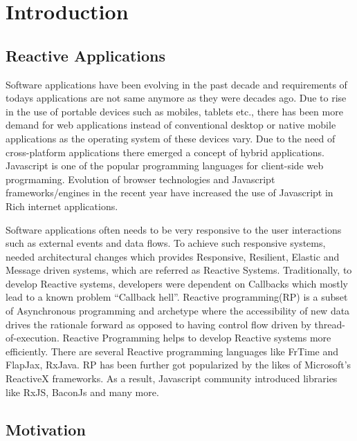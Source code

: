 \chapter{Introduction} \label{chap:Introduction}

\section{Reactive Applications}
Software applications have been evolving in the past decade and requirements of today\textquotesingle s applications are not same anymore as they were decades ago\cite{reactiveManifesto}. 
Due to rise in the use of portable devices such as mobiles, tablets etc., there has been more demand for web applications instead of conventional desktop or native mobile applications as the operating system of these devices vary\cite{7818919}. 
Due to the need of cross-platform applications there emerged a concept of hybrid applications. Javascript is one of the popular programming languages for client-side web progrmaming. Evolution of browser technologies and Javascript frameworks/engines in the recent year have increased the use of Javascript in Rich internet applications\cite{6068340}\cite{Sen:2013:JSR:2491411.2491447}. 

Software applications often needs to be very responsive to the user interactions such as external events and data flows. 
To achieve such responsive systems, needed architectural changes which provides Responsive, Resilient, Elastic and Message driven systems, which are referred as Reactive Systems\cite{reactiveManifesto}. Traditionally, to develop Reactive systems, developers were dependent on Callbacks which mostly lead to a known problem ``Callback hell''. 
Reactive programming(RP) is a subset of Asynchronous programming and archetype where the accessibility of new data drives the rationale forward as opposed to having control flow driven by thread-of-execution. 
Reactive Programming helps to develop Reactive systems more efficiently. 
There are several Reactive programming languages like FrTime\cite{Cooper2006} and FlapJax\cite{Meyerovich:2009:FPL:1639949.1640091}, RxJava\cite{rxJava}. RP has been further got popularized by the likes of Microsoft's ReactiveX frameworks\cite{reactiveX}.  As a result, Javascript community introduced libraries like RxJS\cite{rxjs}, BaconJs\cite{baconjs} and many more.


\section{Motivation}

